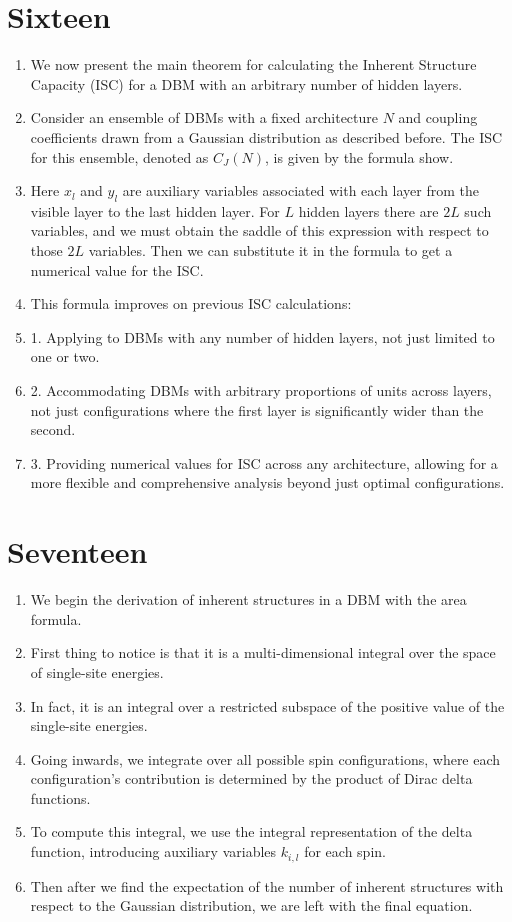 \documentclass{article}
\begin{document}
\section*{Sixteen}
\begin{enumerate}
    \item We now present the main theorem for calculating the Inherent Structure Capacity (ISC) for a DBM with an arbitrary number of hidden layers.
    \item Consider an ensemble of DBMs with a fixed architecture \(N\) and coupling coefficients drawn from a Gaussian distribution as described before. The ISC for this ensemble, denoted as \(C_J(N)\), is given by the formula show.
    \item Here \(x_l\) and \(y_l\) are auxiliary variables associated with each layer from the visible layer to the last hidden layer. For \(L\) hidden layers there are \(2L\) such variables, and we must obtain the saddle of this expression with respect to those \(2L\) variables. Then we can substitute it in the formula to get a numerical value for the ISC.
    \item This formula improves on previous ISC calculations:
    \item 1. Applying to DBMs with any number of hidden layers, not just limited to one or two.
    \item 2. Accommodating DBMs with arbitrary proportions of units across layers, not just configurations where the first layer is significantly wider than the second.
    \item 3. Providing numerical values for ISC across any architecture, allowing for a more flexible and comprehensive analysis beyond just optimal configurations.
\end{enumerate}

\section*{Seventeen}
\begin{enumerate}
    \item We begin the derivation of inherent structures in a DBM with the area formula.
    \item First thing to notice is that it is a multi-dimensional integral over the space of single-site energies.
    \item In fact, it is an integral over a restricted subspace of the positive value of the single-site energies.
    \item Going inwards, we integrate over all possible spin configurations, where each configuration's contribution is determined by the product of Dirac delta functions.
    \item To compute this integral, we use the integral representation of the delta function, introducing auxiliary variables \( k_{i,l} \) for each spin.
    \item Then after we find the expectation of the number of inherent structures with respect to the Gaussian distribution, we are left with the final equation.
\end{enumerate}
\end{document}
